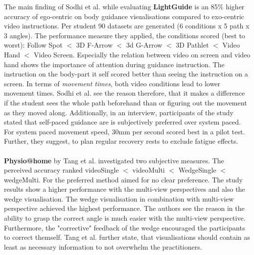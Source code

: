 The main finding of Sodhi et al. while evaluating \textbf{LightGuide} is an 85\% higher accuracy of ego-centric on body guidance visualisations compared to exo-centric video instructions.
Per student 90 datasets are generated (6 conditions x 5 path x 3 angles). The performance measure they applied, the conditions scored (best to worst): Follow Spot $<$ 3D F-Arrow $<$ 3d G-Arrow $<$ 3D Pathlet $<$ Video Hand $<$ Video Screen. Especially the relation between video on screen and video hand shows the importance of attention during guidance instruction. The instruction on the body-part it self scored better than seeing the instruction on a screen. In terms of \textit{movement times}, both video conditions lead to lower movement times. Sodhi et al. see the reason therefore, that it makes a difference if the student sees the whole path beforehand than or figuring out the movement as they moved along. Additionally, in an interview, participants of the study stated that self-paced guidance are is subjectively preferred over system paced. For system paced movement speed, 30mm per second scored best in a pilot test. Further, they suggest, to plan regular recovery rests to exclude fatigue effects.\\ \\
\textbf{Physio@home} by Tang et al. \cite{Tang2015} investigated two subjective measures. The perceived accuracy ranked videoSingle $<$ videoMulti $<$ WedgeSingle $<$ wedgeMulti. For the preferred method aimed for no clear preference. The study results show a higher performance with the multi-view perspectives and also the wedge visualisation. The wedge visualisation in combination with multi-view perspective achieved the highest performance. The authors see the reason in the ability to grasp the correct angle is much easier with the multi-view perspective. Furthermore, the "corrective" feedback of the wedge encouraged the participants to correct themself. Tang et al. further state, that visualisations should contain as least as necessary information to not overwhelm the practitioners. 
